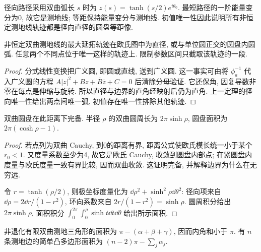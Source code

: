 径向路径采用双曲弧长 $s$ 时为 $z(s)=\tanh(s/2)e^{i\theta_0}$. 最短路径的一阶能量变分为0, 故它是测地线; 等距保持能量变分与测地线. 初值唯一性因此说明所有非恒定测地线轨迹都是径向直径的圆盘等距像.
\begin{corollary}\label{cor:disk-geodesics}
非恒定双曲测地线的最大延拓轨迹在欧氏图中为直径, 或与单位圆正交的圆盘内圆弧. 任意两个不同点位于唯一这样的轨迹上. 限制参数区间只截取该轨迹的一段.
\end{corollary}
\begin{proof}
分式线性变换把广义圆, 即圆或直线, 送到广义圆. 这一事实可由将 $\phi_a^{-1}$ 代入广义圆的方程 $A|z|^2+Bz+\overline B\overline z+C=0$ 后清除分母验证. 它还保角, 因复导数非零在每点是伸缩与旋转. 所以直径与边界的直角经映射后仍为直角. 上一定理的径向唯一性给出两点间唯一弧, 初值存在唯一性排除其他轨迹.
\end{proof}
\begin{center}
\end{center}
\begin{proposition}
双曲圆盘在此距离下完备. 半径 $\rho$ 的双曲圆周长为 $2\pi\sinh\rho$, 圆盘面积为 $2\pi(\cosh\rho-1)$.
\end{proposition}
\begin{proof}
若点列为双曲 Cauchy, 到0的距离有界, 距离公式使欧氏模长统一小于某个 $r_0<1$. 又度量系数至少为4, 故它是欧氏 Cauchy, 收敛到圆盘内部点; 在紧圆盘内度量与欧氏度量一致有界比较, 因而双曲收敛. 这证明完备, 并解释边界为什么在无穷远.

令 $r=\tanh(\rho/2)$, 则极坐标度量化为 $\dd\rho^2+\sinh^2\rho\dd\theta^2$: 径向项来自 $\dd\rho=2\dd r/(1-r^2)$, 环向系数来自 $2r/(1-r^2)=\sinh\rho$. 圆周积分给出 $2\pi\sinh\rho$, 面积积分 $\int_0^{2\pi}\int_0^\rho\sinh t\dd t\dd\theta$ 给出所示面积.
\end{proof}
\begin{proposition}
非退化有限双曲测地三角形的面积为 $\pi-(\alpha+\beta+\gamma)$, 因而内角和小于 $\pi$. 有 $n$ 条测地边的简单凸多边形面积为 $(n-2)\pi-\sum_j\alpha_j$.
\end{proposition}
